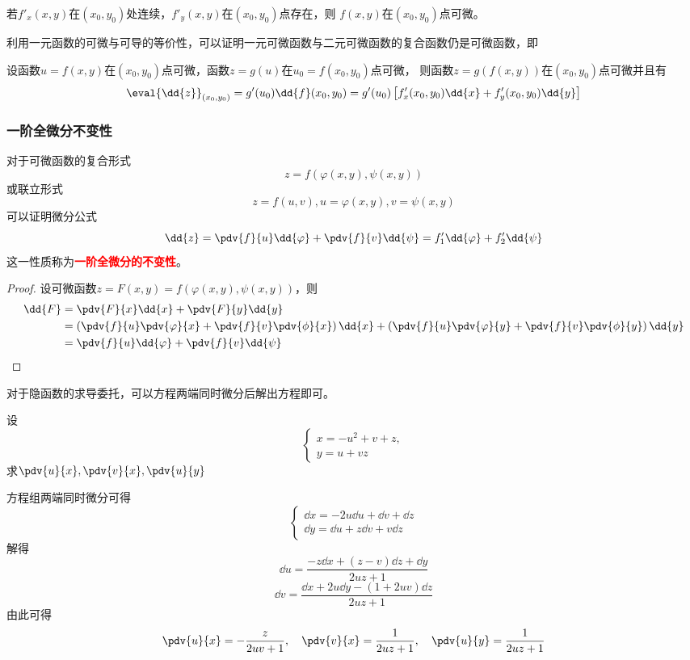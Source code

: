 \begin{theorem}
    若$f'_x(x,y)$在$(x_0,y_0)$处连续，$f'_y(x,y)$在$(x_0,y_0)$点存在，则
    $f(x,y)$在$(x_0,y_0)$点可微。
\end{theorem}

利用一元函数的可微与可导的等价性，可以证明一元可微函数与二元可微函数的复合函数仍是可微函数，即
\begin{theorem}
    设函数$u=f(x,y)$在$(x_0,y_0)$点可微，函数$z=g(u)$在$u_0=f(x_0,y_0)$点可微，
    则函数$z=g(f(x,y))$在$(x_0,y_0)$点可微并且有
    \[ \eval{\dd{z}}_{(x_0,y_0)} = g'(u_0)\dd{f}(x_0,y_0) = g'(u_0)\left[f'_x(x_0,y_0)\dd{x} + f'_y(x_0,y_0)\dd{y}\right] \]
\end{theorem}

\subsubsection{一阶全微分不变性}
对于可微函数的复合形式
\[ z= f(\varphi(x,y),\psi(x,y)) \]
或联立形式
\[ z = f(u,v), u=\varphi(x,y), v=\psi(x,y) \]
可以证明微分公式
\begin{equation}
    \dd{z}
    = \pdv{f}{u}\dd{\varphi} + \pdv{f}{v}\dd{\psi}
    = f'_1\dd{\varphi} + f'_2\dd{\psi}
\end{equation}
这一性质称为\textcolor{red}{\textbf{\textsf{一阶全微分的不变性}}}。
\begin{proof}
    设可微函数$z=F(x,y) = f(\varphi(x,y), \psi(x,y))$，则
    \begin{align*}
        \dd{F} & = \pdv{F}{x}\dd{x} + \pdv{F}{y}\dd{y}                                     \\
               & = \left(\pdv{f}{u}\pdv{\varphi}{x} + \pdv{f}{v}\pdv{\phi}{x}\right)\dd{x}
        +\left(\pdv{f}{u}\pdv{\varphi}{y} + \pdv{f}{v}\pdv{\phi}{y}\right)\dd{y}           \\
               & =\pdv{f}{u}\dd{\varphi} + \pdv{f}{v}\dd{\psi}
    \end{align*}
\end{proof}

对于隐函数的求导委托，可以方程两端同时微分后解出方程即可。
\begin{example}
    设
    \[
        \begin{cases}
            x=-u^2+v+z, \\
            y=u+vz
        \end{cases}
    \]
    求$\displaystyle \pdv{u}{x}, \pdv{v}{x}, \pdv{u}{y}$
\end{example}
\begin{solution}
    方程组两端同时微分可得
    \[
        \begin{cases}
            \dd{x} = -2u\dd{u} + \dd{v} + \dd{z} \\
            \dd{y} = \dd{u} + z\dd{v} + v\dd{z}
        \end{cases}
    \]
    解得
    \[ \dd{u} = \frac{-z\dd{x} + (z-v)\dd{z} + \dd{y}}{2uz + 1} \]
    \[ \dd{v} = \frac{\dd{x} + 2u\dd{y} - (1+2uv)\dd{z}}{2uz + 1} \]
    由此可得
    \[
        \pdv{u}{x} = -\frac{z}{2uv+1},\quad
        \pdv{v}{x} = \frac{1}{2uz+1},\quad
        \pdv{u}{y} = \frac{1}{2uz+1}
    \]
\end{solution}

